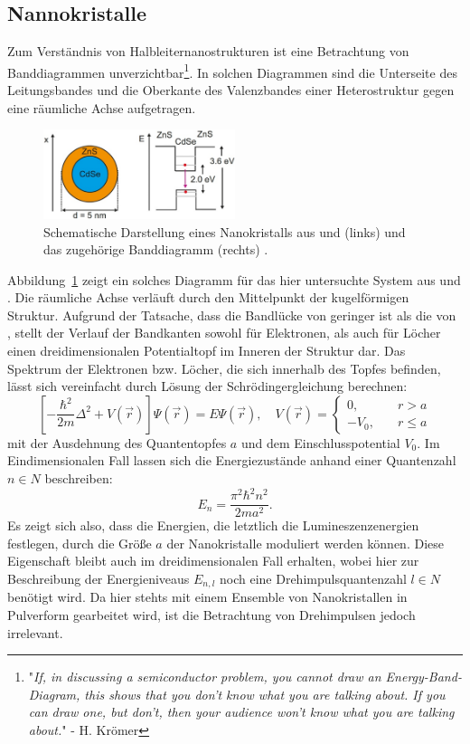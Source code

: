 \subsection{Nannokristalle}
Zum Verständnis von Halbleiternanostrukturen ist eine Betrachtung von Banddiagrammen unverzichtbar\footnote{"\textit{If,
in discussing a semiconductor problem, you cannot draw an Energy-Band-Diagram, this shows
that you don't know what you are talking about. If you can draw one, but don't, then your audience
won't know what you are talking about.}"  - H. Krömer}. In solchen Diagrammen sind
die Unterseite des Leitungsbandes und die Oberkante des Valenzbandes einer Heterostruktur gegen eine
räumliche Achse aufgetragen.
\begin{figure}
  \centering
  \includegraphics[width = 0.5\textwidth]{pics/banddiagramm.png}
  \caption{Schematische Darstellung eines Nanokristalls aus  und  (links) und
  das zugehörige Banddiagramm (rechts) \cite{anleitung_pl}.}
  \label{fig: energy_diagram}
\end{figure}
Abbildung~\ref{fig: energy_diagram} zeigt ein solches Diagramm für das hier untersuchte System aus  und
. Die räumliche Achse verläuft durch den Mittelpunkt der kugelförmigen Struktur. Aufgrund der Tatsache, dass
die Bandlücke von  geringer ist als die von , stellt der Verlauf der Bandkanten sowohl für Elektronen, als auch
für Löcher einen dreidimensionalen Potentialtopf im Inneren der Struktur dar. Das Spektrum der Elektronen bzw. Löcher,
die sich innerhalb des Topfes befinden, lässt sich vereinfacht durch Lösung der Schrödingergleichung berechnen:
\begin{equation}
  \left[-\frac{\hbar^2}{2 m} \Delta^2 + V(\vec{r}) \right] \Psi(\vec{r}) = E \Psi(\vec{r}), \quad
  V(\vec{r}) = \begin{cases}
0,& \quad r > a\\
-V_0,& \quad r \leq a
\end{cases}
\end{equation}
mit der Ausdehnung des Quantentopfes $a$ und dem Einschlusspotential $V_0$.
Im Eindimensionalen Fall lassen sich die Energiezustände
anhand einer Quantenzahl $n \in N$ beschreiben:
\begin{equation}
  E_n = \frac{\pi^2\hbar^2n^2}{ 2 m a^2}.
\end{equation}
Es zeigt sich also, dass die Energien, die letztlich die Lumineszenzenergien festlegen, durch die Größe $a$ der Nanokristalle
moduliert werden können. Diese Eigenschaft bleibt auch im dreidimensionalen Fall erhalten, wobei hier zur Beschreibung der
Energieniveaus $E_{n, l}$ noch eine Drehimpulsquantenzahl $l \in N$ benötigt wird. Da hier stehts mit einem Ensemble von Nanokristallen
in Pulverform gearbeitet wird, ist die Betrachtung von Drehimpulsen jedoch irrelevant.
